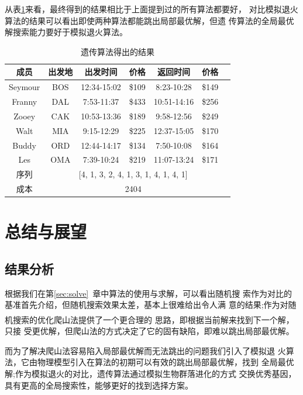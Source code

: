 \documentclass[fontset=fandol,a4paper,zihao=5]{ctexart}
\newcommand{\upcite}[1]{\textsuperscript{\textsuperscript{\cite{#1}}}}
\begin{document}
			从表\ref{tab:ga}来看，最终得到的结果相比于上面提到过的所有算法都要好，
            对比模拟退火算法的结果可以看出即使两种算法都能跳出局部最优解，但遗
            传算法的全局最优解搜索能力要好于模拟退火算法。
			\begin{table}[!htbp]
			\centering
			\caption{遗传算法得出的结果}
			\label{tab:ga}
			\begin{tabular}{ccccccc}
				\toprule[1pt]
				成员     & 出发地& 出发时间    &  价格  &  返回时间    &   价格 \\
				\midrule
				Seymour  &     BOS & 12:34-15:02 & \$109 &  8:23-10:28 & \$149 \\
				Franny   &    DAL &  7:53-11:37 & \$433 & 10:51-14:16 & \$256 \\
				Zooey    &   CAK & 10:53-13:36 & \$189 &  9:58-12:56 & \$249 \\
				Walt     &  MIA  & 9:15-12:29 & \$225 & 12:37-15:05 & \$170 \\
				Buddy    &   ORD & 12:44-14:17 & \$134 &  7:50-10:08 & \$164 \\
				Les      & OMA  & 7:39-10:24 & \$219 & 11:07-13:24 & \$171 \\
				\midrule
				序列    & \multicolumn{5}{c}{[4, 1, 3, 2, 4, 1, 3, 1, 4, 1, 4, 1]} \\
				成本    & \multicolumn{5}{c}{2404} \\
				\bottomrule[1pt]
			\end{tabular} 
			\end{table}
		
	\newpage
	
	\section{总结与展望}
	\label{sec:conclude}
		\subsection{结果分析}
			根据我们在第\ref{sec:solve}\ 章中算法的使用与求解，可以看出随机搜
            索作为对比的基准首先介绍，但随机搜索效果太差，基本上很难给出令人满
            意的结果;作为对随机搜索的优化爬山法提供了一个更合理的
            思路\upcite{Thomas2013算法导论}，即根据当前解来找到下一个解，只接
            受更优解，但爬山法的方式决定了它的固有缺陷，即难以跳出局部最优解。
			
			而为了解决爬山法容易陷入局部最优解而无法跳出的问题我们引入了模拟退
            火算法，它由物理模型引入在算法的初期可以有效的跳出局部最优解，找到
            全局最优解;作为模拟退火的对比，遗传算法通过模拟生物群落进化的方式
            交换优秀基因，具有更高的全局搜索性，能够更好的找到选择方案。
			
\end{document}
